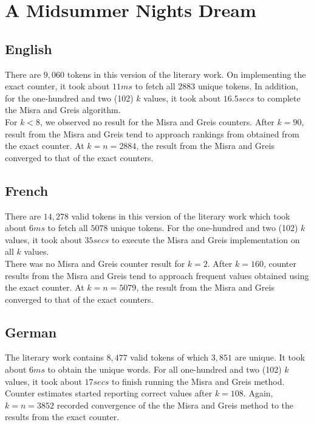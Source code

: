 \documentclass[longpaper, english, final, times]{revdetua}
\begin{document}
	\section{A Midsummer Nights Dream}
		\subsection{English}
			There are $9,060$ tokens in this version of the literary work. On implementing the exact counter, it took about $11 ms$ to fetch all $2883$ unique tokens. In addition, for the one-hundred and two (102) $k$ values, it took about $16.5 secs$ to complete the Misra and Greis algorithm. \\
			
			For $k < 8$, we observed no result for the Misra and Greis counters. After $k=90$, result from the Misra and Greis tend to approach rankings from obtained from the exact counter. At $k=n=2884$, the result from the Misra and Greis converged to that of the exact counters.
			
		\subsection{French}
			There are $14,278$ valid tokens in this version of the literary work which took about $6 ms$ to fetch all $5078$ unique tokens. For the one-hundred and two (102) $k$ values, it took about $35 secs$ to execute the Misra and Greis implementation on all $k$ values. \\
			
			There was no Misra and Greis counter result for $k=2$. After $k=160$, counter results from the Misra and Greis tend to approach frequent values obtained using the exact counter. At $k=n=5079$, the result from the Misra and Greis converged to that of the exact counters.
			
		\subsection{German}
			The literary work contains $8,477$ valid tokens of which $3,851$ are unique. It took about $6 ms$ to obtain the unique words. For all one-hundred and two (102) $k$ values, it took about $17 secs$ to finish running the Misra and Greis method. \\
			
			Counter estimates started reporting correct values after $k=108$. Again, $k=n=3852$ recorded convergence of the the Misra and Greis method to the results from the exact counter.
		
\end{document}
